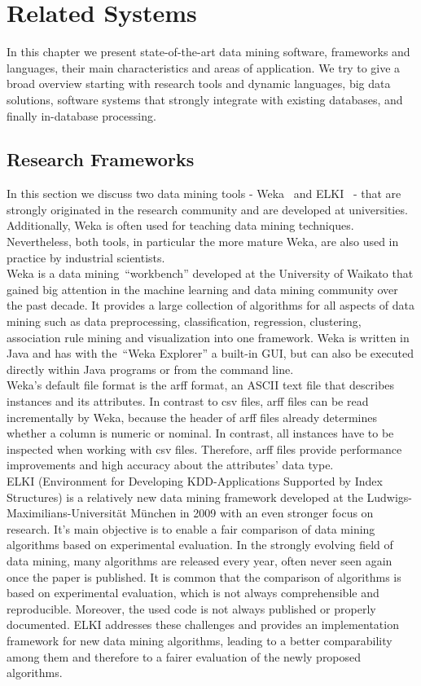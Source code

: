 \chapter{Related Systems}\label{chapter:related}

In this chapter we present state-of-the-art data mining software, frameworks and languages, their main characteristics and areas of application. We try to give a broad overview starting with research tools and dynamic languages, big data solutions, software systems that strongly integrate with existing databases, and finally in-database processing.

\section{Research Frameworks}
In this section we discuss two data mining tools - Weka~\parencite{Hall:2009:WDM:1656274.1656278} and ELKI~\parencite{DBLP:conf/ssdbm/AchtertKZ08} - that are strongly originated in the research community and are developed at universities. Additionally, Weka is often used for teaching data mining techniques. Nevertheless, both tools, in particular the more mature Weka, are also used in practice by industrial scientists.
\\
Weka is a data mining~\enquote{workbench} developed at the University of Waikato that gained big attention in the machine learning and data mining community over the past decade. It provides a large collection of algorithms for all aspects of data mining such as data preprocessing, classification, regression, clustering, association rule mining and visualization into one framework. Weka is written in Java and has with the~\enquote{Weka Explorer} a built-in GUI, but can also be executed directly within Java programs or from the command line. 
\\
Weka's default file format is the arff format, an ASCII text file that describes instances and its attributes. In contrast to csv files, arff files can be read incrementally by Weka, because the header of arff files already determines whether a column is numeric or nominal. In contrast, all instances have to be inspected when working with csv files. Therefore, arff files provide performance improvements and high accuracy about the attributes' data type.
\\
ELKI (Environment for Developing KDD-Applications Supported by Index Structures) is a relatively new data mining framework developed at the Ludwigs-Maximilians-Universität München in 2009 with an even stronger focus on research. It's main objective is to enable a fair comparison of data mining algorithms based on experimental evaluation. In the strongly evolving field of data mining, many algorithms are released every year, often never seen again once the paper is published. It is common that the comparison of algorithms is based on experimental evaluation, which is not always comprehensible and reproducible. Moreover, the used code is not always published or properly documented. ELKI addresses these challenges and provides an implementation framework for new data mining algorithms, leading to a better comparability among them and therefore to a fairer evaluation of the newly proposed algorithms. 
